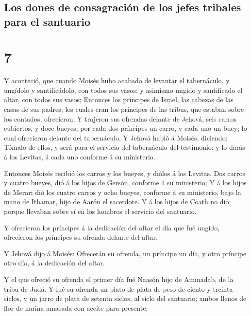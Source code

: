 \hypertarget{los-dones-de-consagraciuxf3n-de-los-jefes-tribales-para-el-santuario}{%
\subsection{Los dones de consagración de los jefes tribales para el
santuario}\label{los-dones-de-consagraciuxf3n-de-los-jefes-tribales-para-el-santuario}}

\hypertarget{section-04-7}{%
\section{7}\label{section-04-7}}

 Y aconteció, que cuando Moisés hubo acabado de levantar
el tabernáculo, y ungídolo y santificádolo, con todos sus vasos; y
asimismo ungido y santificado el altar, con todos sus vasos;
 Entonces los príncipes de Israel, las cabezas de las
casas de sus padres, los cuales eran los príncipes de las tribus, que
estaban sobre los contados, ofrecieron;  Y trajeron sus
ofrendas delante de Jehová, seis carros cubiertos, y doce bueyes; por
cada dos príncipes un carro, y cada uno un buey; lo cual ofrecieron
delante del tabernáculo.  Y Jehová habló á Moisés,
diciendo:  Tómalo de ellos, y será para el servicio del
tabernáculo del testimonio: y lo darás á los Levitas, á cada uno
conforme á su ministerio.

 Entonces Moisés recibió los carros y los bueyes, y diólos
á los Levitas.  Dos carros y cuatro bueyes, dió á los
hijos de Gersón, conforme á su ministerio;  Y á los hijos
de Merari dió los cuatro carros y ocho bueyes, conforme á su ministerio,
bajo la mano de Ithamar, hijo de Aarón el sacerdote.  Y á
los hijos de Coath no dió; porque llevaban sobre sí en los hombros el
servicio del santuario.

 Y ofrecieron los príncipes á la dedicación del altar el
día que fué ungido, ofrecieron los príncipes su ofrenda delante del
altar.

 Y Jehová dijo á Moisés: Ofrecerán su ofrenda, un
príncipe un día, y otro príncipe otro día, á la dedicación del altar.

 Y el que ofreció su ofrenda el primer día fué Naasón
hijo de Aminadab, de la tribu de Judá.  Y fué su ofrenda
un plato de plata de peso de ciento y treinta siclos, y un jarro de
plata de setenta siclos, al siclo del santuario; ambos llenos de flor de
harina amasada con aceite para presente;

